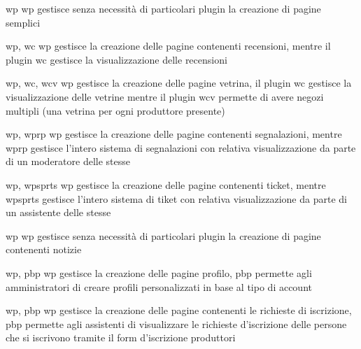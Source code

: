 {\acrlong{wp}}
{\acrlong{wp} gestisce senza necessità di particolari plugin la creazione di pagine semplici}


{\acrlong{wp}, \acrlong{wc}}
{\acrlong{wp} gestisce la creazione delle pagine contenenti recensioni, mentre il plugin \acrlong{wc} gestisce la visualizzazione delle recensioni}


{\acrlong{wp}, \acrlong{wc}, \acrlong{wcv}}
{\acrlong{wp} gestisce la creazione delle pagine vetrina, il plugin \acrlong{wc} gestisce la visualizzazione delle vetrine mentre il plugin \acrlong{wcv} permette di avere negozi multipli (una vetrina per ogni produttore presente)}


{\acrlong{wp}, \acrlong{wprp}}
{\acrlong{wp} gestisce la creazione delle pagine contenenti segnalazioni, mentre \acrlong{wprp} gestisce l'intero sistema di segnalazioni con relativa visualizzazione da parte di un moderatore delle stesse}


{\acrlong{wp}, \acrlong{wpsprts}}
{\acrlong{wp} gestisce la creazione delle pagine contenenti ticket, mentre \acrlong{wpsprts} gestisce l'intero sistema di tiket con relativa visualizzazione da parte di un assistente delle stesse}


{\acrlong{wp}}
{\acrlong{wp} gestisce senza necessità di particolari plugin la creazione di pagine contenenti notizie}


{\acrlong{wp}, \acrlong{pbp}}
{\acrlong{wp} gestisce la creazione delle pagine profilo, \acrlong{pbp} permette agli amministratori di creare profili personalizzati in base al tipo di account}


{\acrlong{wp}, \acrlong{pbp}}
{\acrlong{wp} gestisce la creazione delle pagine contenenti le richieste di iscrizione, \acrlong{pbp} permette agli assistenti di visualizzare le richieste d'iscrizione delle persone che si iscrivono tramite il form d'iscrizione produttori}


